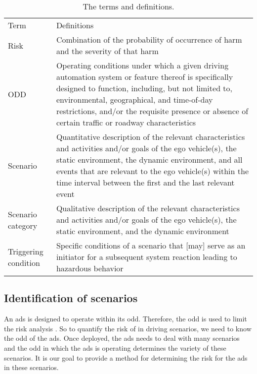\begin{table}
	\caption{The terms and definitions.}
	\label{tab:definitions}
	\begin{tabularx}{\linewidth}{TD}
		\toprule
		Term & Definitions \\ \otoprule
		Risk & Combination of the probability of occurrence of harm and the severity of that harm \autocite{ISO26262} \\
		ODD & Operating conditions under which a given driving automation system or feature thereof is specifically designed to function, including, but not limited to, environmental, geographical, and time-of-day restrictions, and/or the requisite presence or absence of certain traffic or roadway characteristics \autocite{sae2021j3016} \\
		Scenario & Quantitative description of the relevant characteristics and activities and/or goals of the ego vehicle(s), the static environment, the dynamic environment, and all events that are relevant to the ego vehicle(s) within the time interval between the first and the last relevant event \autocite{degelder2021ontology} \\
		Scenario category & Qualitative description of the relevant characteristics and activities and/or goals of the ego vehicle(s), the static environment, and the dynamic environment \autocite{degelder2021ontology} \\
		Triggering condition & Specific conditions of a scenario that [may] serve as an initiator for a subsequent system reaction leading to hazardous behavior \autocite{ISO21448} \\
		\bottomrule
	\end{tabularx}
\end{table}



\subsection{Identification of scenarios}
\label{sec:scenario identification}

An \ac{ads} is designed to operate within its \ac{odd}.
Therefore, the \ac{odd} is used to limit the risk analysis \autocite{gyllenhammar2020towards}.
So to quantify the risk of  in driving scenarios, we need to know the \ac{odd} of the \ac{ads}.
Once deployed, the \ac{ads} needs to deal with many scenarios and the \ac{odd} in which the \ac{ads} is operating determines the variety of these scenarios.
It is our goal to provide a method for determining the risk for the \ac{ads} in these scenarios.

